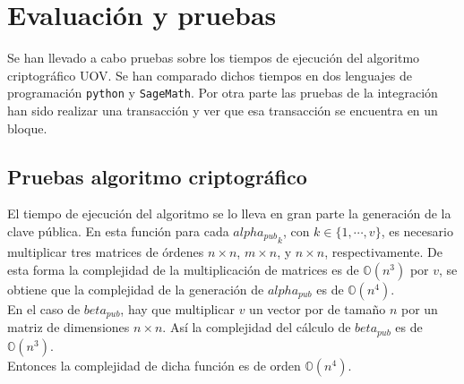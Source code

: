 \chapter{Evaluación y pruebas}


Se han llevado a cabo pruebas sobre los tiempos de ejecución del algoritmo criptográfico UOV. Se han comparado dichos tiempos en dos lenguajes de programación \texttt{python} y \texttt{SageMath}. Por otra parte las pruebas de la integración han sido realizar una transacción y ver que esa transacción se encuentra en un bloque.\\


\section{Pruebas algoritmo criptográfico}

El tiempo de ejecución del algoritmo se lo lleva en gran parte la generación de la clave pública. En esta función para cada ${alpha_{pub}}_k$, con $k \in \{1,\cdots, v\}$, es necesario multiplicar tres matrices de órdenes $n \times n$, $m \times n$, y $n \times n$, respectivamente. De esta forma la complejidad de la multiplicación de matrices es de $\mathds{O}(n^3)$ por $v$, se obtiene que la complejidad de la generación de $alpha_{pub}$ es de $\mathds{O}(n^4)$.\\

En el caso de $beta_{pub}$, hay que multiplicar $v$ un vector por de tamaño $n$ por un matriz de dimensiones $n \times n$. Así la complejidad del cálculo de $beta_{pub}$ es de $\mathds{O}(n^3)$.\\

Entonces la complejidad de dicha función es de orden $\mathds{O}(n^4)$.\\

